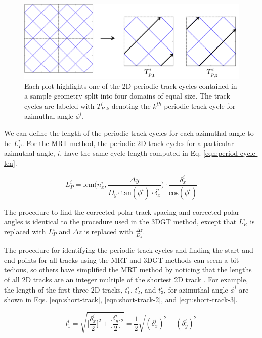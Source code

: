 \begin{figure}[h]
	\centering
	\includegraphics[width=5in]{figures/mc2015/2d_periodic_track_cycles_2.png}
	\caption{Each plot highlights one of the 2D periodic track cycles contained in a sample geometry split into four domains of equal size. The track cycles are labeled with $T_{P,k}^i$ denoting the $k^{th}$ periodic track cycle for azimuthal angle $\phi^i$.}
	\label{periodic cycles}
\end{figure}

We can define the length of the periodic track cycles for each azimuthal angle to be $L_P^{i}$. For the MRT method, the periodic 2D track cycles for a particular azimuthal angle, $i$, have the same cycle length computed in Eq. \ref{eqn:period-cycle-len}.

\begin{equation}
L_P^i = \text{lcm} \bigg( n_x^i,  \frac{\Delta y}{D_y \cdot \text{tan} (\phi^i) \cdot \delta_x^i} \bigg) \cdot \frac{\delta_x^i}{\text{cos} (\phi^i)}
\label{eqn:period-cycle-len}
\end{equation}


\noindent
The procedure to find the corrected polar track spacing and corrected polar angles is identical to the procedure used in the 3DGT method, except that $L_R^i$ is replaced with $L_P^i$ and $\Delta z$ is replaced with $\frac{\Delta z}{D_z}$.

The procedure for identifying the periodic track cycles and finding the start and end points for all tracks using the MRT and 3DGT methods can seem a bit tedious, so others have simplified the MRT method by noticing that the lengths of all 2D tracks are an integer multiple of the shortest 2D track \cite{kochunas}. For example, the length of the first three 2D tracks, $t_1^i$, $t_2^i$, and $t_3^i$, for azimuthal angle $\phi^i$ are shown in Eqs. \ref{eqn:short-track}, \ref{eqn:short-track-2}, and \ref{eqn:short-track-3}.

\begin{equation}
l_1^i = \sqrt{\bigg[\frac{\delta_x^i}{2}\bigg]^2 + \bigg[\frac{\delta_y^i}{2}\bigg]^2} = \frac{1}{2} \sqrt{(\delta_x^i)^2 + (\delta_y^i)^2}
\label{eqn:short-track}
\end{equation}


